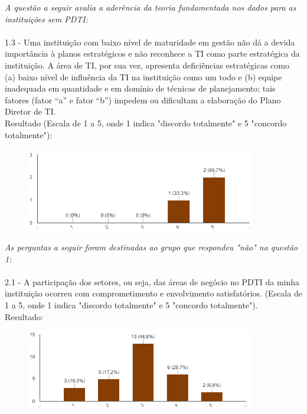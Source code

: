 \textit{A questão a seguir avalia a aderência da teoria fundamentada nos dados para as instituições sem PDTI:}
\\
\\1.3 - Uma instituição com baixo nível de maturidade em gestão não dá a devida importância à planos estratégicos e não reconhece a TI como parte estratégica da instituição. A área de TI, por sua vez, apresenta deficiências estratégicas como (a) baixo nível de influência da TI na instituição como um todo e (b) equipe inadequada em quantidade e em domínio de técnicas de planejamento; tais fatores (fator “a” e fator “b”) impedem ou dificultam a elaboração do Plano Diretor de TI.
\\Resultado (Escala de 1 a 5, onde 1 indica "discordo totalmente" e 5 "concordo totalmente"):
\begin{figure}[h]
\centering %
\includegraphics[width=10cm, frame]{figuras/grafico_ava_grupoSemPDTI.PNG}
\end{figure}

\textit{As perguntas a seguir foram destinadas ao grupo que respondeu "não" na questão 1:}
\\
\\2.1 - A participação dos setores, ou seja, das áreas de negócio no PDTI da minha instituição ocorreu com comprometimento e envolvimento satisfatórios. (Escala de 1 a 5, onde 1 indica "discordo totalmente" e 5 "concordo totalmente").
\\Resultado:
\begin{figure}[h]
\centering %
\includegraphics[width=10cm, frame]{figuras/apendiceB-2-1.png}
\end{figure}

